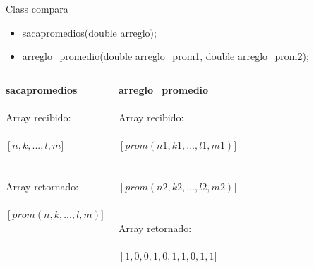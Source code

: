 \documentclass{beamer}
\begin{document}

\begin{frame}

Class compara
 
\begin{itemize}
\item sacapromedios(double arreglo);
\item arreglo\_promedio(double arreglo\_prom1, double arreglo\_prom2);

\end{itemize}

\end{frame}


\begin{frame}

\begin{columns}[c] 

\textbf{sacapromedios}\\~\\

Array recibido:\\~\\
$\left[n,k,...,l,m\right.]$\\~\\~\\

Array retornado:\\~\\
$\left[prom(n,k,...,l,m)\right.]$


\textbf{arreglo\_promedio}\\~\\

Array recibido:\\~\\

$\left[prom(n1,k1,...,l1,m1)\right.]$\\~\\~\\
$\left[prom(n2,k2,...,l2,m2)\right.]$\\~\\~\\
Array retornado:\\~\\

$\left[1,0,0,1,0,1,1,0,1,1\right.]$

\end{columns}


\end{frame}
\end{document}
